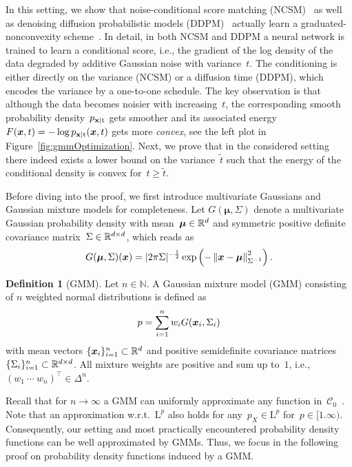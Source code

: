 \documentclass{article} %
\theoremstyle{plain}
\theoremstyle{definition}
\newtheorem{definition}[theorem]{Definition}
\theoremstyle{remark}
\newcommand{\N}{\mathbb{N}}
\newcommand{\C}{\mathcal{C}}
\renewcommand{\L}{\mathrm{L}}
\newcommand{\norm}[1]{\left\Vert#1\right\Vert}
\newcommand{\pdf}[1]{p_{#1}}
\begin{document}
In this setting, we show that noise-conditional score matching (NCSM)~\citep{SoEr19} as well as denoising diffusion probabilistic models (DDPM)~\citep{HoJa20} actually learn a graduated-nonconvexity scheme~\citep{BlZi87}.
In detail, in both NCSM and DDPM a neural network is trained to learn a conditional score, i.e., the gradient of the log density of the data degraded by additive Gaussian noise with variance~$t$.
The conditioning is either directly on the variance (NCSM) or a diffusion time (DDPM), which encodes the variance by a one-to-one schedule.
The key observation is that although the data becomes noisier with increasing~$t$, the corresponding smooth probability density~$\pdf{\rvx\vert\rt}$ gets smoother and its associated energy~$F(\vx,t)=-\log\pdf{\rvx\vert\rt}(\vx,t)$ gets more \emph{convex}, see the left plot in Figure~\ref{fig:gmmOptimization}.
Next, we prove that in the considered setting there indeed exists a lower bound on the variance~$\widetilde{t}$ such that the energy of the conditional density is convex for~$t\geq\widetilde{t}$.

Before diving into the proof, we first introduce multivariate Gaussians and Gaussian mixture models for completeness.
Let $G(\bm{\mu},\Sigma)$ denote a multivariate Gaussian probability density with mean~$\bm{\mu}\in\mathbb{R}^d$ and symmetric positive definite covariance matrix~$\Sigma\in\mathbb{R}^{d\times d}$, which reads as
\[
G(\bm{\mu},\Sigma)(\vx)=\vert 2\pi\Sigma\vert^{-\frac{1}{2}}\exp\left(-\norm{\vx-\bm{\mu}}_{\Sigma^{-1}}^2\right).
\]
\begin{definition}[GMM]
Let $n\in\N$.
A Gaussian mixture model (GMM) consisting of $n$ weighted normal distributions is defined as
\[
p = \sum_{i=1}^n w_i G({\bm{x}}_i,\Sigma_i)
\]
with mean vectors $\{{\bm{x}}_i\}_{i=1}^n\subset\mathbb{R}^d$ and positive semidefinite covariance matrices~$\{\Sigma_i\}_{i=1}^n\subset\mathbb{R}^{d\times d}$.
All mixture weights are positive and sum up to~$1$, i.e., $(w_1\ \cdots\ w_n)^\top\in\Delta^n$.
\end{definition}
Recall that for $n\to\infty$ a GMM can uniformly approximate any function in~$\C_0$~\citep{NgNg20}.
Note that an approximation w.r.t.~$\L^p$ also holds for any~$p_X\in\L^p$ for~$p\in[1.\infty)$.
Consequently, our setting and most practically encountered probability density functions can be well approximated by GMMs.
Thus, we focus in the following proof on probability density functions induced by a GMM.
\end{document}
